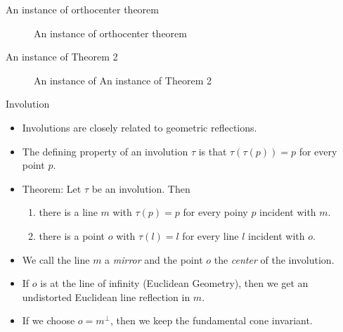 \documentclass[10pt,ignorenonframetext,serif,onlymath]{beamer}
\providecommand{\tightlist}{%
  \setlength{\itemsep}{0pt}\setlength{\parskip}{0pt}}
\begin{document}
\begin{frame}{An instance of orthocenter theorem}
\protect\hypertarget{sec:an-instance-of-orthocenter-theorem}{}

\begin{figure}[hp]
\centering

\caption{An instance of orthocenter theorem}
\label{fig:orthocenter}
\end{figure}

\end{frame}

\begin{frame}{An instance of Theorem 2}
\protect\hypertarget{sec:an-instance-of-theorem-2}{}

\begin{figure}[hp]
\centering

\caption{An instance of An instance of Theorem 2}
\label{fig:orthocenter2}
\end{figure}

\end{frame}

\begin{frame}{Involution}
\protect\hypertarget{sec:involution}{}

\begin{itemize}
\item
  Involutions are closely related to geometric reflections.
\item
  The defining property of an involution \(\tau\) is that
  \(\tau(\tau(p)) = p\) for every point \(p\).
\item
  Theorem: Let \(\tau\) be an involution. Then

  \begin{enumerate}
  [1.]
  \tightlist
  \item
    there is a line \(m\) with \(\tau(p) = p\) for every poiny \(p\)
    incident with \(m\).
  \item
    there is a point \(o\) with \(\tau(l) = l\) for every line \(l\)
    incident with \(o\).
  \end{enumerate}
\item
  We call the line \(m\) a \emph{mirror} and the point \(o\) the
  \emph{center} of the involution.
\item
  If \(o\) is at the line of infinity (Euclidean Geometry), then we get
  an undistorted Euclidean line reflection in \(m\).
\item
  If we choose \(o = m^\perp\), then we keep the fundamental cone
  invariant.
\end{itemize}

\end{frame}
\end{document}
